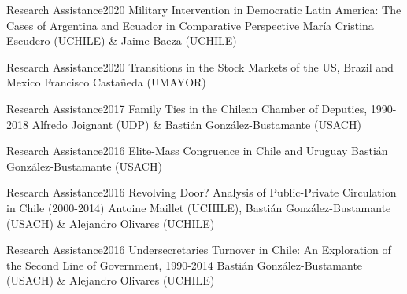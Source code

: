 





\begin{projects}

	\project
	{Research Assistance}{2020}
	{Military Intervention in Democratic Latin America: The Cases of Argentina and Ecuador in Comparative Perspective}
	{María Cristina Escudero (UCHILE) \& Jaime Baeza (UCHILE)}

	\project
	{Research Assistance}{2020}
	{Transitions in the Stock Markets of the US, Brazil and Mexico}
	{Francisco Castañeda (UMAYOR)}
	
	\project
	{Research Assistance}{2017}
	{Family Ties in the Chilean Chamber of Deputies, 1990-2018}
	{Alfredo Joignant (UDP) \& Bastián González-Bustamante (USACH)}
	
	\project
	{Research Assistance}{2016}
	{Elite-Mass Congruence in Chile and Uruguay}
	{Bastián González-Bustamante (USACH)}
	
	\project
	{Research Assistance}{2016}
	{Revolving Door? Analysis of Public-Private Circulation in Chile (2000-2014)}
	{Antoine Maillet (UCHILE), Bastián González-Bustamante (USACH) \& Alejandro Olivares (UCHILE)}

	\project
	{Research Assistance}{2016}
	{Undersecretaries Turnover in Chile: An Exploration of the Second Line of Government, 1990-2014}
	{Bastián González-Bustamante (USACH) \& Alejandro Olivares (UCHILE)}
	
\end{projects}
